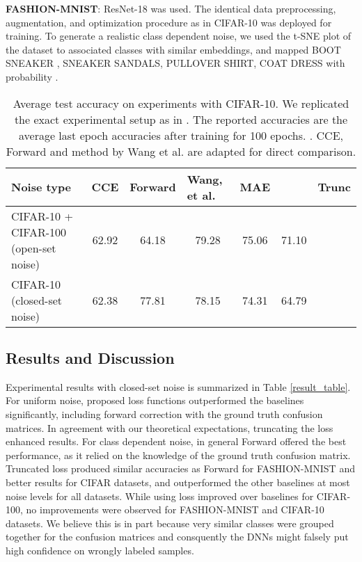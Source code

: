 \documentclass{article}
\begin{document}
\textbf{FASHION-MNIST}: ResNet-18 was used. The identical data preprocessing, augmentation, and optimization  procedure as in CIFAR-10 was deployed for training. To generate a realistic class dependent noise, we used the t-SNE \cite{maaten2008visualizing} plot of the dataset to associated classes with similar embeddings, and mapped BOOT  SNEAKER , SNEAKER  SANDALS, PULLOVER  SHIRT, COAT  DRESS with probability . 
\begin{table}[]
\caption{Average test accuracy on experiments with CIFAR-10. We replicated the exact experimental setup as in \cite{wang2018iterative}. The reported accuracies are the average last epoch accuracies after training for 100 epochs. . CCE, Forward and method by Wang et al. are adapted for direct comparison.}
\centering
\begin{adjustbox}{width=1.0\textwidth}
\label{my-label}
\begin{tabular}{l|cccccc}
\hline
Noise type & \multicolumn{1}{l}{CCE \cite{wang2018iterative}} & \multicolumn{1}{l}{Forward \cite{wang2018iterative}} & \multicolumn{1}{l}{Wang, et al. \cite{wang2018iterative}} & MAE & \multicolumn{1}{l}{} & \multicolumn{1}{l}{Trunc } \\ \hline \hline
CIFAR-10 + CIFAR-100 (open-set noise) & 62.92 & 64.18 & 79.28 & 75.06 & 71.10 &  \\ \hline
CIFAR-10 (closed-set noise) & 62.38 & 77.81 & 78.15 & 74.31 & 64.79 &  \\ \hline
\end{tabular}
\end{adjustbox}
\label{open-set}
\end{table}
\subsection{Results and Discussion}
Experimental results with closed-set noise is summarized in Table \ref{result_table}. For uniform noise, proposed loss functions outperformed the baselines significantly, including forward correction with the ground truth confusion matrices. 
In agreement with our theoretical expectations, truncating the  loss enhanced results. 
For class dependent noise, in general Forward  offered the best performance, as it relied on the knowledge of the ground truth confusion matrix. 
Truncated  loss produced similar accuracies as Forward  for FASHION-MNIST and better results for CIFAR datasets, and outperformed the other baselines at most noise levels for all datasets.
While using  loss improved over baselines for CIFAR-100, no improvements were observed for FASHION-MNIST and CIFAR-10 datasets. 
We believe this is in part because very similar classes were grouped together for the confusion matrices and consquently the DNNs might falsely put high confidence on wrongly labeled samples. 
\end{document}
